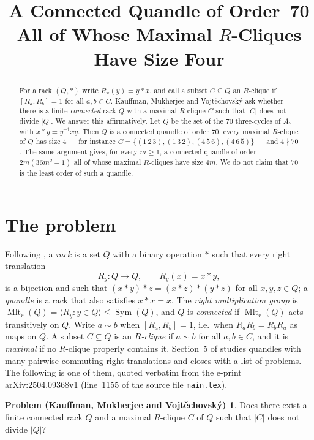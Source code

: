\documentclass[11pt]{amsart}
\title[Maximal $R$-cliques of size four]
{A Connected Quandle of Order~70 All of Whose Maximal $R$-Cliques Have Size Four}
\date{}
\theoremstyle{definition}
\newtheorem*{problem}{Problem (Kauffman, Mukherjee and Vojt\v{e}chovsk\'y)}
\theoremstyle{remark}
\DeclareMathOperator{\Mlt}{Mlt}
\newcommand{\Rt}{R}
\begin{document}
\begin{abstract}
For a rack $(Q,*)$ write $\Rt_x(y)=y*x$, and call a subset $C\subseteq Q$ an
$R$-clique if $[\Rt_a,\Rt_b]=1$ for all $a,b\in C$. Kauffman, Mukherjee and
Vojt\v{e}chovsk\'y ask whether there is a finite \emph{connected} rack $Q$ with
a maximal $R$-clique $C$ such that $|C|$ does not divide $|Q|$. We answer this
affirmatively. Let $Q$ be the set of the $70$ three-cycles of $A_7$ with
$x*y=y^{-1}xy$. Then $Q$ is a connected quandle of order $70$, every maximal
$R$-clique of $Q$ has size $4$ --- for instance
$C=\{(1\,2\,3),(1\,3\,2),(4\,5\,6),(4\,6\,5)\}$ --- and $4\nmid70$. The same
argument gives, for every $m\ge1$, a connected quandle of order $2m(36m^2-1)$
all of whose maximal $R$-cliques have size $4m$. We do not claim that $70$ is
the least order of such a quandle.
\end{abstract}

\maketitle

\section{The problem}

Following \cite{KMV}, a \emph{rack} is a set $Q$ with a binary operation $*$
such that every right translation
\[
  \Rt_y\colon Q\to Q,\qquad \Rt_y(x)=x*y,
\]
is a bijection and such that $(x*y)*z=(x*z)*(y*z)$ for all $x,y,z\in Q$; a
\emph{quandle} is a rack that also satisfies $x*x=x$. The
\emph{right multiplication group} is $\Mlt_r(Q)=\langle \Rt_y: y\in Q\rangle
\le\operatorname{Sym}(Q)$, and $Q$ is \emph{connected} if $\Mlt_r(Q)$ acts
transitively on $Q$. Write $a\sim b$ when $[\Rt_a,\Rt_b]=1$, i.e.\ when
$\Rt_a\Rt_b=\Rt_b\Rt_a$ as maps on $Q$. A subset $C\subseteq Q$ is an
\emph{$R$-clique} if $a\sim b$ for all $a,b\in C$, and it is \emph{maximal} if
no $R$-clique properly contains it. Section~5 of \cite{KMV} studies quandles
with many pairwise commuting right translations and closes with a list of
problems. The following is one of them, quoted verbatim from the e-print
arXiv:2504.09368v1 (line~1155 of the source file \texttt{main.tex}).

\begin{problem}
Does there exist a finite connected rack $Q$ and a maximal $R$-clique $C$ of
$Q$ such that $|C|$ does not divide $|Q|$?
\end{problem}
\end{document}
